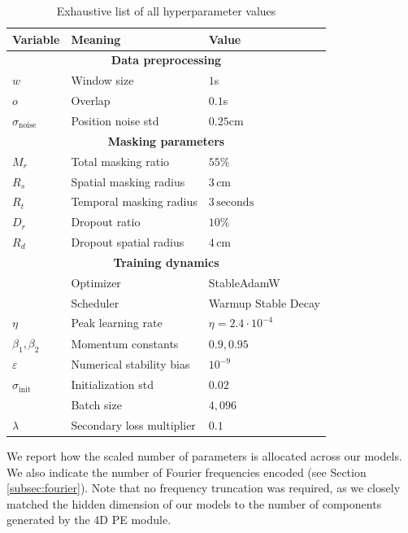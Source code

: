 \documentclass{article}
\begin{document}
\begin{table}[H]
    \centering
    \caption{Exhaustive list of all hyperparameter values}
    \begin{tabular}{lll}
        \toprule
        \textbf{Variable} & \textbf{Meaning} & \textbf{Value} \\
        \midrule
        \multicolumn{3}{c}{\textbf{Data preprocessing}} \\
        $w$ & Window size & $1$s \\
        $o$ & Overlap  & $0.1$s \\
        $\sigma_{\text{noise}}$ & Position noise std & $0.25$cm \\
        \midrule
        \multicolumn{3}{c}{\textbf{Masking parameters}} \\
\( M_r \) & Total masking ratio                          & \( 55\% \) \\
\( R_s \) & Spatial masking radius                       & \( 3 \, \text{cm} \) \\ 
\( R_t \) & Temporal masking radius                      & \( 3 \, \text{seconds} \) \\ 
\( D_r \) & Dropout ratio                                & \( 10\% \) \\ 
\( R_d \) & Dropout spatial radius                       & \( 4 \, \text{cm} \) \\
        \midrule
        \multicolumn{3}{c}{\textbf{Training dynamics}} \\
               & Optimizer & StableAdamW \\
               & Scheduler & Warmup Stable Decay \\
        $\eta$ & Peak learning rate & $\eta=2.4\cdot10^{-4}$ \\
        $\beta_1,\beta_2$ & Momentum constants & $0.9,0.95$ \\
        $\varepsilon$ & Numerical stability bias & $10^{-9}$ \\
        $\sigma_{\text{init}}$ & Initialization std & $0.02$ \\
         & Batch size & $4,096$ \\
        $\lambda$ & Secondary loss multiplier & $0.1$ \\
        \bottomrule
    \end{tabular}
    \label{tab:summary}
\end{table}


We report how the scaled number of parameters is allocated across our models. We also indicate the number of Fourier frequencies encoded (see Section \ref{subsec:fourier}). Note that no frequency truncation was required, as we closely matched the hidden dimension of our models to the number of components generated by the 4D PE module.
\end{document}
